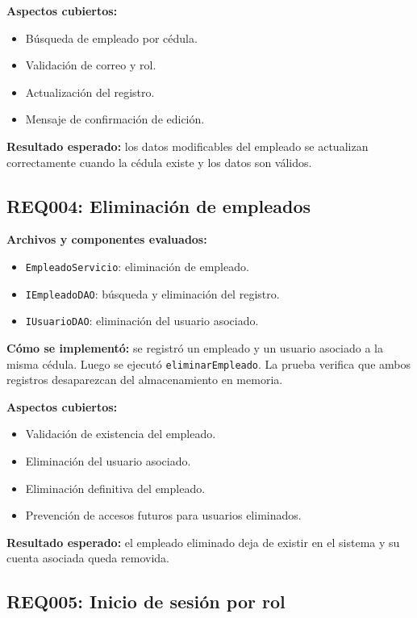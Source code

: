 \documentclass[12pt,a4paper]{article}
\begin{document}
\textbf{Aspectos cubiertos:}
\begin{itemize}[leftmargin=*]
    \item Búsqueda de empleado por cédula.
    \item Validación de correo y rol.
    \item Actualización del registro.
    \item Mensaje de confirmación de edición.
\end{itemize}

\textbf{Resultado esperado:} los datos modificables del empleado se actualizan correctamente cuando la cédula existe y los datos son válidos.

\subsection{REQ004: Eliminación de empleados}

\textbf{Archivos y componentes evaluados:}
\begin{itemize}[leftmargin=*]
    \item \texttt{EmpleadoServicio}: eliminación de empleado.
    \item \texttt{IEmpleadoDAO}: búsqueda y eliminación del registro.
    \item \texttt{IUsuarioDAO}: eliminación del usuario asociado.
\end{itemize}

\textbf{Cómo se implementó:} se registró un empleado y un usuario asociado a la misma cédula. Luego se ejecutó \texttt{eliminarEmpleado}. La prueba verifica que ambos registros desaparezcan del almacenamiento en memoria.

\textbf{Aspectos cubiertos:}
\begin{itemize}[leftmargin=*]
    \item Validación de existencia del empleado.
    \item Eliminación del usuario asociado.
    \item Eliminación definitiva del empleado.
    \item Prevención de accesos futuros para usuarios eliminados.
\end{itemize}

\textbf{Resultado esperado:} el empleado eliminado deja de existir en el sistema y su cuenta asociada queda removida.

\subsection{REQ005: Inicio de sesión por rol}
\end{document}
